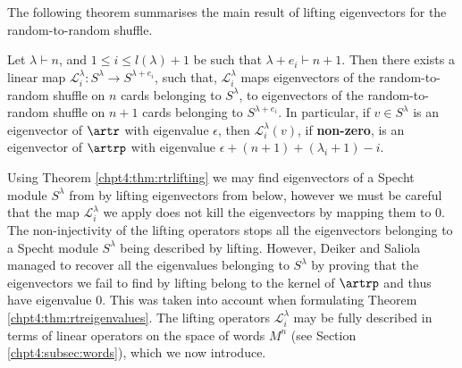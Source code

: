 \documentclass[11pt]{report}
\begin{document}
The following theorem summarises the main result of lifting eigenvectors for the random-to-random shuffle.

\begin{thm}
	\label{chpt4:thm:rtrlifting}
	Let $\lambda \vdash n$, and $1\leq i \leq l(\lambda)+1$ be such that $\lambda+e_{i} \vdash n+1$. Then there exists a linear map $\mathcal{L}^{\lambda}_{i}:S^{\lambda} \to S^{\lambda+e_{i}}$, such that,
	$\mathcal{L}^{\lambda}_{i}$ maps eigenvectors of the random-to-random shuffle on $n$ cards belonging to $S^{\lambda}$, to eigenvectors of the random-to-random shuffle on $n+1$ cards belonging to $S^{\lambda+e_{i}}$. In particular, if $v \in S^{\lambda}$ is an eigenvector of $\artr$ with eigenvalue $\epsilon$, then $\mathcal{L}^{\lambda}_{i}(v)$, if \textbf{non-zero}, is an eigenvector of $\artrp$ with eigenvalue $\epsilon + (n+1) + (\lambda_{i} +1) -i$.
\end{thm}

Using Theorem \ref{chpt4:thm:rtrlifting} we may find eigenvectors of a Specht module $S^{\lambda}$ from by lifting eigenvectors from below, however we must be careful that the map $\mathcal{L}^{\lambda}_{i}$ we apply does not kill the eigenvectors by mapping them to $0$. The non-injectivity of the lifting operators stops all the eigenvectors belonging to a Specht module $S^{\lambda}$ being described by lifting. However,
Deiker and Saliola managed to recover all the eigenvalues belonging to $S^{\lambda}$ by proving that the eigenvectors we fail to find by lifting belong to the kernel of $\artrp$ and thus have eigenvalue $0$. This was taken into account when formulating Theorem \ref{chpt4:thm:rtreigenvalues}. The lifting operators $\mathcal{L}^{\lambda}_{i}$ may be fully described in terms of linear operators on the space of words $M^{n}$ (see  Section \ref{chpt4:subsec:words}), which we now introduce.
\end{document}
